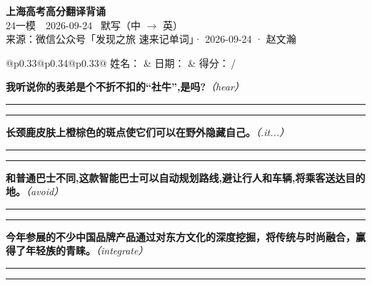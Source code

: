 \documentclass[11pt,a4paper]{article}
\newcommand{\num}[1]{\makebox[1.9em][r]{#1.}\hspace{0.3em}}
\newcommand{\wline}{\noindent\rule{\linewidth}{0.4pt}}
\newcommand{\prompt}[1]{\emph{\textcolor{tipblue}{\small（#1）}}}
\begin{document}
\pagestyle{plain}
\begin{center}
{\LARGE\bfseries 上海高考高分翻译背诵 }\\[0.25em]
{\large 24一模　2026-09-24 \quad\ 默写（中 $\to$ 英）}\\[0.35em]
{\footnotesize 来源：微信公众号「发现之旅 速来记单词」· 2026-09-24 · 赵文瀚}
\end{center}

\vspace{0.4em}
\noindent\begin{tabular}{@{}p{0.33\textwidth}@{}p{0.34\textwidth}@{}p{0.33\textwidth}@{}}
姓名：\underline{\hspace{2.0cm}} & 日期：\underline{\hspace{2.0cm}} & 得分：\underline{\hspace{1.4cm}}\,/ \\
\end{tabular}

\vspace{0.5em}

\vspace{0.8em}
\num{1}\textbf{我听说你的表弟是个不折不扣的“社牛”,是吗?}\prompt{hear}

\vspace{0.3em}

\wline\vspace{0.3em}
\wline

\num{2}\textbf{长颈鹿皮肤上橙棕色的斑点使它们可以在野外隐藏自己。}\prompt{.it...}

\vspace{0.3em}

\wline\vspace{0.3em}
\wline

\num{3}\textbf{和普通巴士不同,这款智能巴士可以自动规划路线,避让行人和车辆,将乘客送达目的地。}\prompt{avoid}

\vspace{0.3em}

\wline\vspace{0.3em}
\wline

\num{4}\textbf{今年参展的不少中国品牌产品通过对东方文化的深度挖掘，将传统与时尚融合，赢得了年轻族的青睐。}\prompt{integrate}

\vspace{0.3em}

\wline\vspace{0.3em}
\wline
\end{document}
